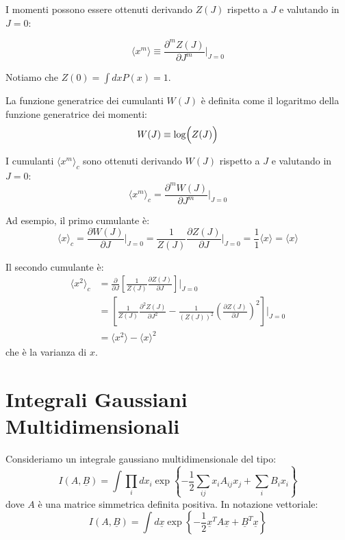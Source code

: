 I momenti possono essere ottenuti derivando $Z(J)$ rispetto a $J$ e valutando in $J=0$:
\begin{tcolorbox}[
    colback=colorA!5,      
    colframe=colorA,       
    arc=3mm,               
    boxrule=1.2pt
]
\begin{equation}
\langle x^m \rangle \equiv \frac{\partial^m Z(J)}{\partial J^m} \bigg|_{J=0} \end{equation}
\end{tcolorbox}
Notiamo che $Z(0) = \int dx P(x) = 1$.

La funzione generatrice dei cumulanti $W(J)$ è definita come il logaritmo della funzione generatrice dei momenti:
\begin{equation}
W(J) \equiv \log \Bigl( Z(J) \Bigr)
\end{equation}

I cumulanti $\langle x^m \rangle_c$ sono ottenuti derivando $W(J)$ rispetto a $J$ e valutando in $J=0$:
\begin{equation}
\langle x^m \rangle_c = \frac{\partial^m W(J)}{\partial J^m} \bigg|_{J=0}
\end{equation}

Ad esempio, il primo cumulante è:
\begin{equation}
\langle x \rangle_c = \frac{\partial W(J)}{\partial J} \bigg|_{J=0} = \frac{1}{Z(J)} \frac{\partial Z(J)}{\partial J} \bigg|_{J=0} = \frac{1}{1} \langle x \rangle = \langle x \rangle
\end{equation}

Il secondo cumulante è:
\begin{align}
\langle x^2 \rangle_c &= \frac{\partial}{\partial J} \left[ \frac{1}{Z(J)} \frac{\partial Z(J)}{\partial J} \right] \bigg|_{J=0} \nonumber \\
&= \left[ \frac{1}{Z(J)} \frac{\partial^2 Z(J)}{\partial J^2} - \frac{1}{(Z(J))^2} \left( \frac{\partial Z(J)}{\partial J} \right)^2 \right] \bigg|_{J=0} \nonumber \\
&= \langle x^2 \rangle - \langle x \rangle^2
\end{align}
che è la varianza di $x$.

\section{Integrali Gaussiani Multidimensionali}
Consideriamo un integrale gaussiano multidimensionale del tipo:
\begin{equation}
I(A, \underline{B}) = \int \prod_i dx_i \exp \left\{ -\frac{1}{2} \sum_{ij} x_i A_{ij} x_j + \sum_i B_i x_i \right\}
\end{equation}
dove $A$ è una matrice simmetrica definita positiva. In notazione vettoriale:
\begin{equation}
I(A, \underline{B}) = \int d\underline{x} \exp \left\{ -\frac{1}{2} \underline{x}^T A \underline{x} + \underline{B}^T \underline{x} \right\}
\end{equation}

